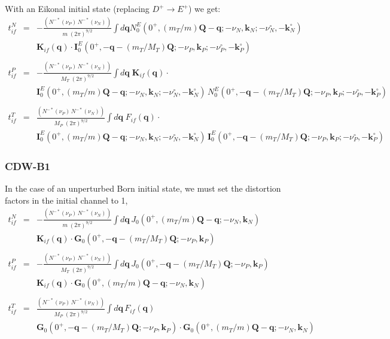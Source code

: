With an Eikonal initial state (replacing $D^{+} \to E^{+}$) we get:
\begin{eqnarray}\label{Q:tn_if-eikon}
t^{N}_{if}&=& -\frac{\left(N^{-*}(\nu_{P}) \,N^{-*}(\nu_{N}) \right)}{m
\; (2 \pi)^{9/2}} \int d \bm{q} N^{E}_{0}(0^{+}, (m_{T}/m)\bm{Q} -
\bm{q}; -\nu_{N}, \bm{k}_{N}; -\nu_{N}^{\circ}, -\bm{k}_{N}^{\circ} ) \,
  \\
&& \bm{K}_{if}(\bm{q}) \cdot \bm{I}^{E}_{0}( 0^{+} ,
-\bm{q}-(m_{T}/M_{T})\bm{Q} ; -\nu_{P}, \bm{k}_{P} ; -\nu_{P}^{\circ},
-\bm{k}_{P}^{\circ}) \nonumber
  \\
\nonumber \\
t^{P}_{if} &=& -\frac{\left(N^{-*}(\nu_{P}) \,N^{-*}(\nu_{N})
\right)}{M_{T} \; (2 \pi)^{9/2}} \int d \bm{q} \;
\bm{K}_{if}(\bm{q}) \cdot
  \\
&& \bm{I}^{E}_{0}(0^{+}, (m_{T}/m)\bm{Q} - \bm{q}; -\nu_{N},
\bm{k}_{N}; -\nu_{N}^{\circ}, -\bm{k}_{N}^{\circ} ) \,  N^{E}_{0}( 0^{+} ,
-\bm{q}-(m_{T}/M_{T})\bm{Q};-\nu_{P},\bm{k}_{P}; -\nu_{P}^{\circ},
-\bm{k}_{P}^{\circ}) \nonumber
\\
\nonumber \\
t^{T}_{if}&=& \frac{\left(N^{-*}(\nu_{P}) \,N^{-*}(\nu_{N})
\right)}{M_{P} \; (2 \pi)^{9/2}} \int d \bm{q} \; F_{if}(\bm{q})
\cdot
  \\
&& \bm{I}^{E}_{0}(0^{+}, (m_{T}/m)\bm{Q} - \bm{q}; -\nu_{N},
\bm{k}_{N}; -\nu_{N}^{\circ}, -\bm{k}_{N}^{\circ} ) \,  \bm{I}^{E}_{0}( 0^{+} ,
-\bm{q}-(m_{T}/M_{T})\bm{Q};-\nu_{P},\bm{k}_{P}; -\nu_{P}^{\circ},
-\bm{k}_{P}^{\circ}) \nonumber
\end{eqnarray}

\subsubsection{CDW-B1}

In the case of an unperturbed Born initial state, we must set the
distortion factors in the initial channel to 1,
\begin{eqnarray}\label{Q:tn_if-born}
t^{N}_{if}&=& -\frac{\left(N^{-*}(\nu_{P}) \,N^{-*}(\nu_{N}) \right)}{m
\; (2 \pi)^{9/2}} \int d \bm{q} \, J_{0}(0^{+}, (m_{T}/m)\bm{Q} -
\bm{q}; -\nu_{N}, \bm{k}_{N} ) \,
  \\
&& \bm{K}_{if}(\bm{q}) \cdot \bm{G}_{0}( 0^{+} ,
-\bm{q}-(m_{T}/M_{T})\bm{Q};-\nu_{P},\bm{k}_{P}) \nonumber
  \\
\nonumber \\
t^{P}_{if}&=& -\frac{\left(N^{-*}(\nu_{P}) \,N^{-*}(\nu_{N})
\right)}{M_{T} \; (2 \pi)^{9/2}} \int d \bm{q} \, J_{0}( 0^{+} ,
-\bm{q}-(m_{T}/M_{T})\bm{Q};-\nu_{P},\bm{k}_{P})  \,
  \\
&& \bm{K}_{if}(\bm{q}) \cdot \bm{G}_{0}(0^{+}, (m_{T}/m)\bm{Q} -
\bm{q}; -\nu_{N}, \bm{k}_{N} )\nonumber
  \\
\nonumber \\
t^{T}_{if}&=& \frac{\left(N^{-*}(\nu_{P}) \,N^{-*}(\nu_{N})
\right)}{M_{P} \; (2 \pi)^{9/2}} \int d \bm{q} \,   F_{if}(\bm{q})
  \\
&&  \bm{G}_{0}( 0^{+} ,
-\bm{q}-(m_{T}/M_{T})\bm{Q};-\nu_{P},\bm{k}_{P})\cdot \bm{G}_{0}(0^{+},
(m_{T}/m)\bm{Q} - \bm{q}; -\nu_{N}, \bm{k}_{N} )\nonumber
\end{eqnarray}

